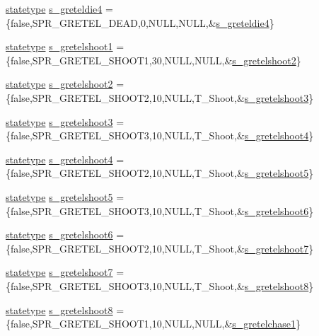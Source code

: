 \begin{DoxyCompactItemize}
\hyperlink{structstatestruct}{statetype} \hyperlink{WL__ACT2_8C_a95821a58802556e05bfe6530c5eead56}{s\_\-greteldie4} = \{false,SPR\_\-GRETEL\_\-DEAD,0,NULL,NULL,\&\hyperlink{WL__ACT2_8C_a95821a58802556e05bfe6530c5eead56}{s\_\-greteldie4}\}
\item 
\hyperlink{structstatestruct}{statetype} \hyperlink{WL__ACT2_8C_a73a1c53d4b9962b650a781bbedaaf302}{s\_\-gretelshoot1} = \{false,SPR\_\-GRETEL\_\-SHOOT1,30,NULL,NULL,\&\hyperlink{WL__ACT2_8C_a68ef551d215ee44de5e466fa62a20cfa}{s\_\-gretelshoot2}\}
\item 
\hyperlink{structstatestruct}{statetype} \hyperlink{WL__ACT2_8C_a68ef551d215ee44de5e466fa62a20cfa}{s\_\-gretelshoot2} = \{false,SPR\_\-GRETEL\_\-SHOOT2,10,NULL,T\_\-Shoot,\&\hyperlink{WL__ACT2_8C_a7674dcf09ae440f7a060ba04c3e79165}{s\_\-gretelshoot3}\}
\item 
\hyperlink{structstatestruct}{statetype} \hyperlink{WL__ACT2_8C_a7674dcf09ae440f7a060ba04c3e79165}{s\_\-gretelshoot3} = \{false,SPR\_\-GRETEL\_\-SHOOT3,10,NULL,T\_\-Shoot,\&\hyperlink{WL__ACT2_8C_aee62a066bdc868cc8dd092d4478aa228}{s\_\-gretelshoot4}\}
\item 
\hyperlink{structstatestruct}{statetype} \hyperlink{WL__ACT2_8C_aee62a066bdc868cc8dd092d4478aa228}{s\_\-gretelshoot4} = \{false,SPR\_\-GRETEL\_\-SHOOT2,10,NULL,T\_\-Shoot,\&\hyperlink{WL__ACT2_8C_afe10dbc0c6c8888c5787db8bf9132b05}{s\_\-gretelshoot5}\}
\item 
\hyperlink{structstatestruct}{statetype} \hyperlink{WL__ACT2_8C_afe10dbc0c6c8888c5787db8bf9132b05}{s\_\-gretelshoot5} = \{false,SPR\_\-GRETEL\_\-SHOOT3,10,NULL,T\_\-Shoot,\&\hyperlink{WL__ACT2_8C_a26398808f97d76d25a767d813890f24f}{s\_\-gretelshoot6}\}
\item 
\hyperlink{structstatestruct}{statetype} \hyperlink{WL__ACT2_8C_a26398808f97d76d25a767d813890f24f}{s\_\-gretelshoot6} = \{false,SPR\_\-GRETEL\_\-SHOOT2,10,NULL,T\_\-Shoot,\&\hyperlink{WL__ACT2_8C_a547bc0128e37954cbaea07a769569f36}{s\_\-gretelshoot7}\}
\item 
\hyperlink{structstatestruct}{statetype} \hyperlink{WL__ACT2_8C_a547bc0128e37954cbaea07a769569f36}{s\_\-gretelshoot7} = \{false,SPR\_\-GRETEL\_\-SHOOT3,10,NULL,T\_\-Shoot,\&\hyperlink{WL__ACT2_8C_ab1b33086e3cb6493142d222a87a8385e}{s\_\-gretelshoot8}\}
\item 
\hyperlink{structstatestruct}{statetype} \hyperlink{WL__ACT2_8C_ab1b33086e3cb6493142d222a87a8385e}{s\_\-gretelshoot8} = \{false,SPR\_\-GRETEL\_\-SHOOT1,10,NULL,NULL,\&\hyperlink{WL__DEF_8H_a6d420f4e0ef48ab7a3e7b67721af7a1e}{s\_\-gretelchase1}\}

\end{DoxyCompactItemize}
